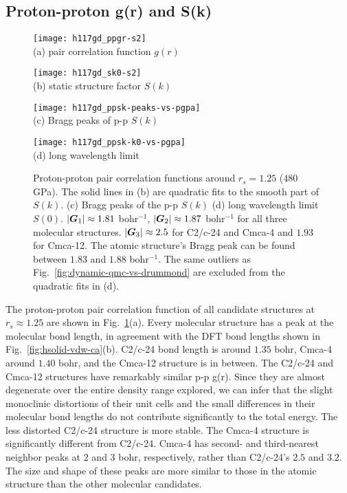 \subsection{Proton-proton g(r) and S(k)}

\begin{figure}[h]
\centering
\begin{minipage}{0.49\textwidth}
\centering
\texttt{[image: h117gd\_ppgr-s2]}\\
(a) pair correlation function $g(r)$
\end{minipage}
\begin{minipage}{0.49\textwidth}
\centering
\texttt{[image: h117gd\_sk0-s2]}\\
(b) static structure factor $S(k)$
\end{minipage}
\centering
\begin{minipage}{0.49\textwidth}
\centering
\texttt{[image: h117gd\_ppsk-peaks-vs-pgpa]}\\
(c) Bragg peaks of p-p $S(k)$
\end{minipage}
\begin{minipage}{0.49\textwidth}
\centering
\texttt{[image: h117gd\_ppsk-k0-vs-pgpa]}\\
(d) long wavelength limit
\end{minipage}
\caption{Proton-proton pair correlation functions around $r_s=1.25$ ($480$ GPa). The solid lines in (b) are quadratic fits to the smooth part of $S(k)$. (c) Bragg peaks of the p-p $S(k)$ (d) long wavelength limit $S(0)$.  $\vert\boldsymbol{G}_1\vert\approx 1.81$ bohr$^{-1}$, $\vert\boldsymbol{G}_2\vert\approx 1.87$ bohr$^{-1}$ for all three molecular structures. $\vert\boldsymbol{G}_3\vert\approx 2.5$ for C2/c-24 and Cmca-4 and $1.93$ for Cmca-12. The atomic structure's Bragg peak can be found between $1.83$ and $1.88$ bohr$^{-1}$. The same outliers as Fig.~\ref{fig:dynamic-qmc-vs-drummond} are excluded from the quadratic fits in (d).}
\label{fig:hsolid-ppgrsk}
\end{figure}

The proton-proton pair correlation function of all candidate structures at $r_s\approx1.25$ are shown in Fig.~\ref{fig:hsolid-ppgrsk}(a).
Every molecular structure has a peak at the molecular bond length, in agreement with the DFT bond lengths shown in Fig.~\ref{fig:hsolid-vdw-ca}(b).
C2/c-24 bond length is around $1.35$ bohr, Cmca-4 around $1.40$ bohr, and the Cmca-12 structure is in between.
The C2/c-24 and Cmca-12 structures have remarkably similar p-p g(r).
Since they are almost degenerate over the entire density range explored, we can infer that the slight monoclinic distortions of their unit cells and the small differences in their molecular bond lengths do not contribute significantly to the total energy.
The less distorted C2/c-24 structure is more stable.
The Cmca-4 structure is significantly different from C2/c-24. Cmca-4 has second- and third-nearest neighbor peaks at $2$ and $3$ bohr, respectively, rather than C2/c-24's $2.5$ and $3.2$. The size and shape of these peaks are more similar to those in the atomic structure than the other molecular candidates.

